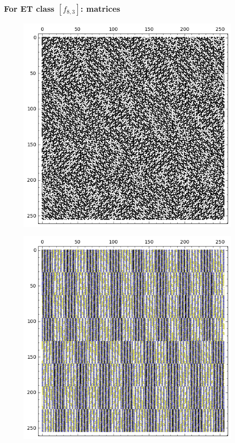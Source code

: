 \documentclass[pdf,sprung,slideColor,nocolorBG]{beamer}
\begin{document}
\begin{frame}
\frametitle{For ET class $[f_{8,3}]$: matrices}
\begin{figure}
\centering
\begin{minipage}{.48\textwidth}
  \centering
  \includegraphics[width=.9\linewidth]{../matrix_plot/c8_3_weight_class_matrix.png}
  \label{fig:8_3_weight_class_matrix}
\end{minipage}%
\begin{minipage}{.48\textwidth}
  \centering
  \includegraphics[width=.9\linewidth]{../matrix_plot/c8_3_bent_cayley_graph_index_matrix.png}
  \label{fig:8_3_bent_cayley_graph_index_matrix}
\end{minipage}
\end{figure}
\end{frame}
\end{document}
